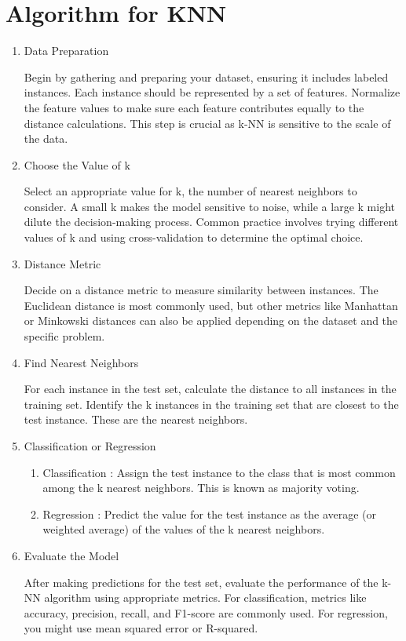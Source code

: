 \documentclass[12pt,a4paper]{report}
\newenvironment{codedstep}[1][]
  {\begin{enumerate}[label=Step \arabic*:]}
  {\end{enumerate}}
\begin{document}
\section{Algorithm for KNN}
\begin{codedstep}
\item Data Preparation

Begin by gathering and preparing your dataset, ensuring it includes labeled instances. Each instance should be represented by a set of features. Normalize the feature values to make sure each feature contributes equally to the distance calculations. This step is crucial as k-NN is sensitive to the scale of the data.

\item Choose the Value of k

Select an appropriate value for k, the number of nearest neighbors to consider. A small k makes the model sensitive to noise, while a large k might dilute the decision-making process. Common practice involves trying different values of k and using cross-validation to determine the optimal choice.

\item Distance Metric

Decide on a distance metric to measure similarity between instances. The Euclidean distance is most commonly used, but other metrics like Manhattan or Minkowski distances can also be applied depending on the dataset and the specific problem.

\item Find Nearest Neighbors

For each instance in the test set, calculate the distance to all instances in the training set. Identify the k instances in the training set that are closest to the test instance. These are the nearest neighbors.

\item Classification or Regression
\begin{enumerate}
\item Classification : Assign the test instance to the class that is most common among the k nearest neighbors. This is known as majority voting.
\item Regression : Predict the value for the test instance as the average (or weighted average) of the values of the k nearest neighbors.
\end{enumerate}
\item Evaluate the Model

After making predictions for the test set, evaluate the performance of the k-NN algorithm using appropriate metrics. For classification, metrics like accuracy, precision, recall, and F1-score are commonly used. For regression, you might use mean squared error or R-squared.


\end{codedstep}
\end{document}
